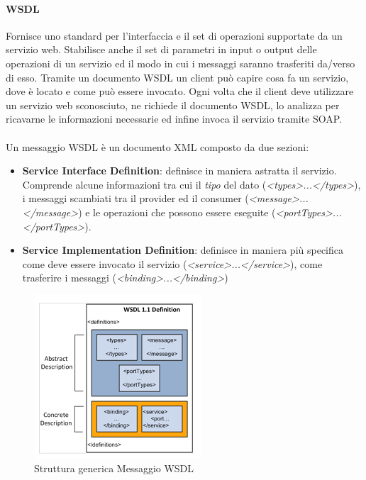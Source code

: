 \documentclass{article}
\begin{document}
\paragraph{WSDL}
Fornisce uno standard per l'interfaccia e il set di operazioni supportate da un servizio web. Stabilisce anche il set di parametri in input o output delle operazioni di un servizio ed il modo in cui i messaggi saranno trasferiti da/verso di esso. Tramite un documento WSDL un client può capire cosa fa un servizio, dove è locato e come può essere invocato. Ogni volta che il client deve utilizzare un servizio web sconosciuto, ne richiede il documento WSDL, lo analizza per ricavarne le informazioni necessarie ed infine invoca il servizio tramite SOAP.
\\ \\
Un messaggio WSDL è un documento XML composto da due sezioni:
\begin{itemize}
    \item \textbf{Service Interface Definition}: definisce in maniera astratta il servizio. Comprende alcune informazioni tra cui il \textit{tipo} del dato (\textit{<types>...</types>}), i messaggi scambiati tra il provider ed il consumer (\textit{<message>...</message>}) e le operazioni che possono essere eseguite (\textit{<portTypes>...</portTypes>}).
    \item \textbf{Service Implementation Definition}: definisce in maniera più specifica come deve essere invocato il servizio (\textit{<service>...</service>}), come trasferire i messaggi (\textit{<binding>...</binding>})
\end{itemize}

\begin{figure}[H]
\centering
\includegraphics{img/WSDLMessage.png}
\caption{Struttura generica Messaggio WSDL}
\end{figure}
\end{document}
